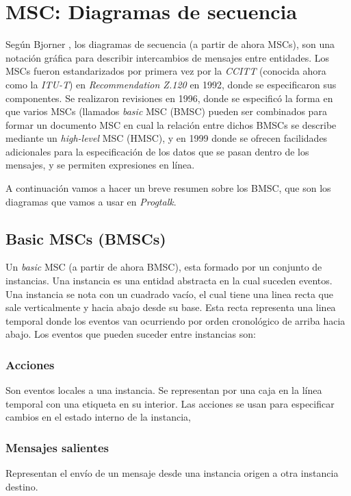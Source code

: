 \chapter{MSC: Diagramas de secuencia}
\label{ch:msc}

Según Bjorner \cite{bjorner}, los diagramas de secuencia (a partir de
ahora MSCs),  son una notación gráfica para describir
intercambios de mensajes entre entidades. Los MSCs fueron
estandarizados por primera vez por la \textit{CCITT} (conocida ahora
como la \textit{ITU-T}) en \textit{Recommendation Z.120} en 1992,
donde se especificaron sus componentes.
Se realizaron revisiones en 1996, donde se especificó la
forma en que varios MSCs (llamados \textit{basic} MSC (BMSC) pueden
ser combinados para formar un documento MSC en cual la relación entre
dichos BMSCs se describe mediante un \textit{high-level} MSC (HMSC), y
en 1999 donde se ofrecen facilidades adicionales para la
especificación de los datos que se pasan dentro de los mensajes, y se
permiten expresiones en línea.

A continuación vamos a hacer un breve resumen sobre los BMSC, que son
los diagramas que vamos a usar en \textit{Progtalk}.

\section{Basic MSCs (BMSCs)}
Un \textit{basic} MSC (a partir de ahora BMSC), esta formado por un
conjunto de instancias. Una instancia es una entidad abstracta en la
cual suceden eventos. Una instancia se nota con un cuadrado vacío, el
cual tiene una linea recta que sale verticalmente y hacia abajo desde
su base. Esta recta representa una linea temporal donde los eventos
van ocurriendo por orden cronológico de arriba hacia abajo. Los
eventos que pueden suceder entre instancias son:

\subsection*{Acciones}
Son eventos locales a una instancia. Se representan por una caja en la
línea temporal con una etiqueta en su interior. Las acciones se usan
para especificar cambios en el estado interno de la instancia,
\subsection*{Mensajes salientes} 
Representan el envío de un mensaje desde una instancia origen a otra
instancia destino.
